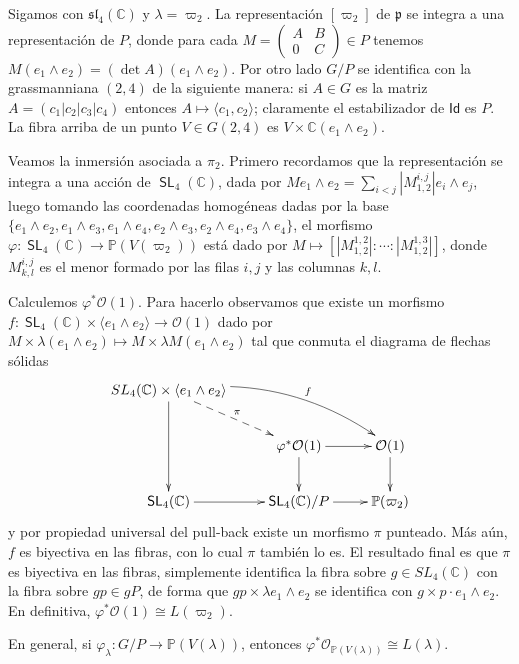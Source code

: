\documentclass[11pt,fleqn]{article}
\newcommand\CC{\mathbb C}
\newcommand\PP{\mathbb P}
\renewcommand\O{\mathcal O}
\renewcommand\phi{\varphi}
\newcommand\id{\mathsf{Id}}
\newcommand\p{\mathfrak p}
\renewcommand\sl{\mathfrak{sl}}
\DeclareMathOperator\SL{\mathsf{SL}}
\renewcommand\sl{\mathfrak{sl}}
\begin{document}
\begin{Example}
Sigamos con $\sl_4(\CC)$ y $\lambda = \varpi_2$. La representación $[\varpi_2]$ de $\p$ se
integra a una representación de $P$, donde para cada $M = \begin{pmatrix} A & B \\ 0 &
C\end{pmatrix} \in P$ tenemos $M (e_1 \wedge e_2) = (\det A) (e_1 \wedge e_2)$.
Por otro lado $G/P$ se identifica con la grassmanniana $(2,4)$ de la siguiente manera:
si $A \in G$ es la matriz $A = (c_1|c_2|c_3|c_4)$ entonces $A \mapsto \langle c_1,
c_2\rangle$; claramente el estabilizador de $\id$ es $P$. La fibra arriba de un punto
$V \in G(2,4)$ es $V \times \CC (e_1 \wedge e_2)$. 

Veamos la inmersión asociada a $\pi_2$. Primero recordamos que la representación se
integra a una acción de $\SL_4(\CC)$, dada por $M e_1 \wedge e_2 = \sum_{i<j}
|M^{i,j}_{1,2}| e_i \wedge e_j$, luego tomando las coordenadas homogéneas dadas por la
base $\{e_1 \wedge e_2, e_1 \wedge e_3, e_1\wedge e_4, e_2 \wedge e_3, e_2 \wedge e_4, e_3
\wedge e_4\}$, el morfismo $\phi: \SL_4(\CC) \to \PP(V(\varpi_2))$ está dado por 
$M \mapsto [|M_{1,2}^{1,2}| : \cdots : |M^{1,3}_{1,2}|]$, donde $M^{i,j}_{k,l}$ es el
menor formado por las filas $i,j$ y las columnas $k,l$. 

Calculemos $\phi^* \O(1)$. Para hacerlo observamos que existe un morfismo $f: \SL_4(\CC)
\times \langle e_1 \wedge e_2\rangle \to \O(1)$ dado por $M \times \lambda(e_1 \wedge e_2)
\mapsto M \times \lambda M(e_1 \wedge e_2)$ tal que conmuta el diagrama de flechas sólidas
\begin{align*}
	\xymatrix{
		SL_4(\CC) \times \langle e_1 \wedge e_2\rangle
		\ar@/^18pt/[rrd]^-f \ar[dd] \ar@{-->}[dr]^\pi & {} &{}\\
	{} & \phi^*\O(1) \ar[r] \ar[d] & \O(1) \ar[d]\\
		\SL_4(\CC) \ar[r] & \SL_4(\CC)/P \ar[r]& \PP(\varpi_2)
	}
\end{align*}
y por propiedad universal del pull-back existe un morfismo $\pi$ punteado. Más aún, $f$ es
biyectiva en las fibras, con lo cual $\pi$ también lo es. El resultado final es que $\pi$
es biyectiva en las fibras, simplemente identifica la fibra sobre $g \in SL_4(\CC)$ con la
fibra sobre $gp \in gP$, de forma que $gp \times \lambda e_1 \wedge e_2$ se identifica con
$g \times p \cdot e_1 \wedge e_2$. En definitiva, $\phi^* \O(1) \cong L(\varpi_2)$.

En general, si $\phi_\lambda: G/P \to \PP(V(\lambda))$, entonces
$\phi^*\O_{\PP(V(\lambda))} \cong L(\lambda)$.
\end{Example}
\end{document}
